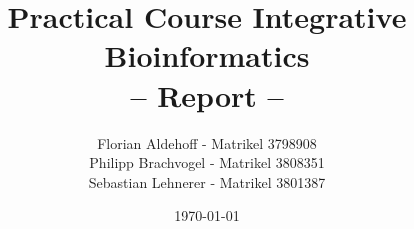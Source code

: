 

\date{\today}
\title{Practical Course Integrative Bioinformatics\\
       -- Report --}
\author{Florian Aldehoff - Matrikel 3798908\\
	Philipp Brachvogel - Matrikel 3808351\\
	Sebastian Lehnerer - Matrikel 3801387}



% 



  \newpage
  
  \pagestyle{fancy}                    %
  
  \tableofcontents
  \newpage


%   
%   
%   
%   

  
  
  
  
  
  \singlespacing 			%
  
  
  \let\normalsize\small
  \appendix
  \small
  
  

